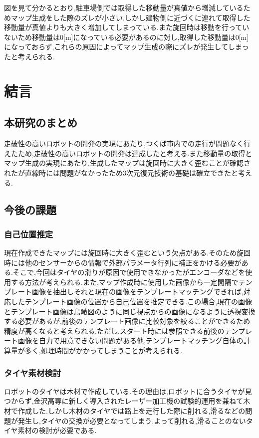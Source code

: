 \documentclass[12pt,oneside]{sotsuken_paper}
\begin{document}
図を見て分かるとおり,駐車場側では取得した移動量が真値から増減しているためマップ生成をした際のズレが小さい.しかし建物側に近づくに連れて取得した移動量が真値よりも大きく増加してしまっている.また旋回時は移動を行っていないため移動量は0[m]になっている必要があるのに対し,取得した移動量は0[m]になっておらず,これらの原因によってマップ生成の際にズレが発生してしまったと考えられる.

\chapter{結言}
\section{本研究のまとめ}
走破性の高いロボットの開発の実現にあたり,つくば市内での走行が問題なく行えたため,走破性の高いロボットの開発は達成したと考える.また移動量の取得とマップ生成の実現にあたり,生成したマップは旋回時に大きく歪むことが確認されたが直線時には問題がなかったため3次元復元技術の基礎は確立できたと考える.

\section{今後の課題}
\subsection{自己位置推定}
現在作成できたマップには旋回時に大きく歪むという欠点がある.そのため旋回時には他のセンサーからの情報で外部パラメータ行列に補正をかける必要がある.そこで,今回はタイヤの滑りが原因で使用できなかったがエンコーダなどを使用する方法が考えられる.また,マップ作成時に使用した画像から一定間隔でテンプレート画像を抽出しそれと現在の画像をテンプレートマッチングできれば,対応したテンプレート画像の位置から自己位置を推定できる.この場合,現在の画像とテンプレート画像は鳥瞰図のように同じ視点からの画像になるように透視変換する必要があるが,前後のテンプレート画像に比較対象を絞ることができるため精度が高くなると考えられる.ただし,スタート時には参照できる前後のテンプレート画像を自力で用意できない問題がある他,テンプレートマッチング自体の計算量が多く,処理時間がかかってしまうことが考えられる.

\subsection{タイヤ素材検討}
ロボットのタイヤは木材で作成している.その理由は,ロボットに合うタイヤが見つからず,金沢高専に新しく導入されたレーザー加工機の試験的運用を兼ねて木材で作成した.しかし木材のタイヤでは路上を走行した際に削れる,滑るなどの問題が発生し,タイヤの交換が必要となってしまう.よって削れる,滑ることのないタイヤ素材の検討が必要である.
\end{document}

